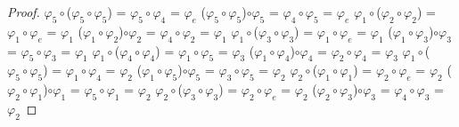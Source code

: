 \documentclass[10pt,a4paper,oneside]{article}
\begin{document}
\begin{proof}
					\newline
					\newline
					$\varphi_{5}\circ$($\varphi_{5}\circ\varphi_{5}$) = $\varphi_{5}\circ\varphi_{4}$ = $\varphi_{e}$
					\newline
					($\varphi_{5}\circ\varphi_{5}$)$\circ\varphi_{5}$ = $\varphi_{4}\circ\varphi_{5}$ = $\varphi_{e}$
					\newline
					\newline
					$\varphi_{1}\circ$($\varphi_{2}\circ\varphi_{2}$) = $\varphi_{1}\circ\varphi_{e}$ = $\varphi_{1}$
					\newline
					($\varphi_{1}\circ\varphi_{2}$)$\circ\varphi_{2}$ = $\varphi_{4}\circ\varphi_{2}$ = $\varphi_{1}$
					\newline
					\newline
					$\varphi_{1}\circ$($\varphi_{3}\circ\varphi_{3}$) = $\varphi_{1}\circ\varphi_{e}$ = $\varphi_{1}$
					\newline
					($\varphi_{1}\circ\varphi_{3}$)$\circ\varphi_{3}$ = $\varphi_{5}\circ\varphi_{3}$ = $\varphi_{1}$
					\newline
					\newline
					$\varphi_{1}\circ$($\varphi_{4}\circ\varphi_{4}$) = $\varphi_{1}\circ\varphi_{5}$ = $\varphi_{3}$
					\newline
					($\varphi_{1}\circ\varphi_{4}$)$\circ\varphi_{4}$ = $\varphi_{2}\circ\varphi_{4}$ = $\varphi_{3}$
					\newline
					\newline
					$\varphi_{1}\circ$($\varphi_{5}\circ\varphi_{5}$) = $\varphi_{1}\circ\varphi_{4}$ = $\varphi_{2}$
					\newline
					($\varphi_{1}\circ\varphi_{5}$)$\circ\varphi_{5}$ = $\varphi_{3}\circ\varphi_{5}$ = $\varphi_{2}$
					\newline
					\newline
					$\varphi_{2}\circ$($\varphi_{1}\circ\varphi_{1}$) = $\varphi_{2}\circ\varphi_{e}$ = $\varphi_{2}$
					\newline
					($\varphi_{2}\circ\varphi_{1}$)$\circ\varphi_{1}$ = $\varphi_{5}\circ\varphi_{1}$ = $\varphi_{2}$
					\newline
					\newline
					$\varphi_{2}\circ$($\varphi_{3}\circ\varphi_{3}$) = $\varphi_{2}\circ\varphi_{e}$ = $\varphi_{2}$
					\newline
					($\varphi_{2}\circ\varphi_{3}$)$\circ\varphi_{3}$ = $\varphi_{4}\circ\varphi_{3}$ = $\varphi_{2}$

\end{proof}
\end{document}

